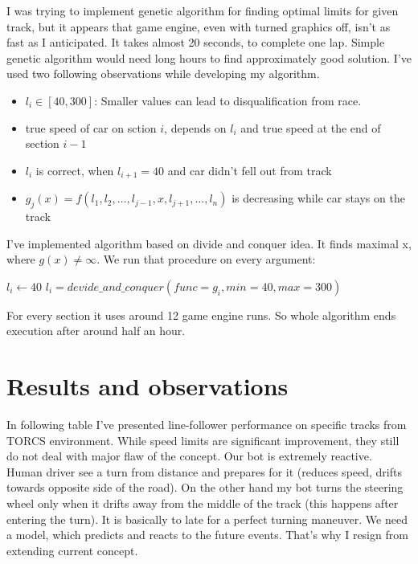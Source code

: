\documentclass[declaration,shortabstract,english,inz]{iithesis}
\begin{document}
I was trying to implement genetic algorithm for finding optimal limits for given track, but it appears that game engine, even with turned graphics off, isn't as fast as I anticipated. It takes almost 20 seconds, to complete one lap. Simple genetic algorithm would need long hours to find approximately good solution. I've used two following observations while developing my algorithm.

\begin{itemize}
    \item  $l_i \in [40, 300]$:  Smaller values can lead to disqualification from race.
    \item  true speed of car on sction $i$, depends on $l_i$ and true speed at the end of section $i-1$
    \item
    $l_i$ is correct, when $l_{i+1} = 40$ and car didn't fell out from track
    \item  $g_j(x) = f(l_1,l_2, \dots,l_{j-1}, x, l_{j+1}, \dots, l_n)$ is decreasing while car stays on the track
    
\end{itemize}


I've implemented algorithm based on divide and conquer idea. It finds maximal x, where $g(x) \neq \infty$. We run that procedure on every argument:

\begin{algorithmic}
    \STATE $l_i\gets 40$
        \STATE $l_i = devide\_and\_conquer(func=g_i, min=40, max=300)$
    \ENDFOR
\end{algorithmic}

For every section it uses around 12 game engine runs. So whole algorithm ends execution after around half an hour.

\section{Results and observations}

In following table I've presented line-follower performance on specific tracks from TORCS environment. While speed limits are significant improvement, they still do not deal with major flaw of the concept. Our bot is extremely reactive. Human driver see a turn from distance and prepares for it (reduces speed, drifts towards opposite side of the road). On the other hand my bot turns the steering wheel only when it drifts away from the middle of the track (this happens after entering the turn). It is basically to late for a perfect turning maneuver. We need a model, which predicts and reacts to the  future events. That's why I resign from extending current concept.
\end{document}
